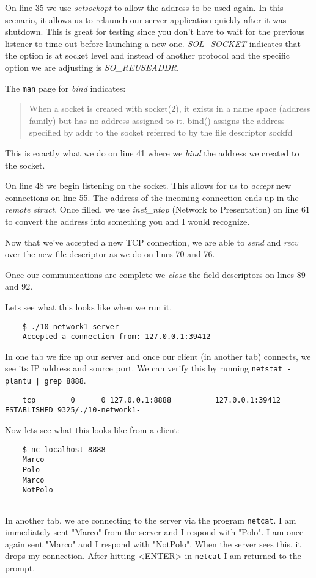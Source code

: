 \documentclass[../main.tex]{subfiles}
\begin{document}
	On line 35 we use \textit{setsockopt} to allow the address to be used again.  In this scenario, it allows us to relaunch our server application quickly after it was shutdown.  This is great for testing since you don't have to wait for the previous listener to time out before launching a new one.  \textit{SOL\_SOCKET} indicates that the option is at socket level and instead of another protocol and the specific option we are adjusting is \textit{SO\_REUSEADDR}.
	
	The \texttt{man} page for \textit{bind} indicates:
	\begin{quotation}
		When a socket is created with socket(2), it exists in a name space (address family) but has no address assigned to it.  bind() assigns the address specified by addr to the socket referred to by the file descriptor sockfd
	\end{quotation}
	This is exactly what we do on line 41 where we \textit{bind} the address we created to the socket.
	
	On line 48 we begin listening on the socket.  This allows for us to \textit{accept} new connections on line 55.  The address of the incoming connection ends up in the \textit{remote struct}.  Once filled, we use \textit{inet\_ntop} (Network to Presentation) on line 61 to convert the address into something you and I would recognize.
	
	Now that we've accepted a new TCP connection, we are able to \textit{send} and \textit{recv} over the new file descriptor as we do on lines 70 and 76.
	
	Once our communications are complete we \textit{close} the field descriptors on lines 89 and 92.
	
	Lets see what this looks like when we run it.
	
	\begin{verbatim}
	$ ./10-network1-server 
	Accepted a connection from: 127.0.0.1:39412
	\end{verbatim}
	
	In one tab we fire up our server and once our client (in another tab) connects, we see its IP address and source port.  We can verify this by running \texttt{netstat -plantu | grep 8888}.  
	
	\begin{verbatim}
	tcp        0      0 127.0.0.1:8888          127.0.0.1:39412         ESTABLISHED 9325/./10-network1- 
	\end{verbatim}
	
	Now lets see what this looks like from a client:
	
	\begin{verbatim}
	$ nc localhost 8888
	Marco
	Polo
	Marco
	NotPolo
	
	\end{verbatim}
	
	In another tab, we are connecting to the server via the program \texttt{netcat}.  I am immediately sent "Marco" from the server and I respond with "Polo".  I am once again sent "Marco" and I respond with "NotPolo".  When the server sees this, it drops my connection.  After hitting <ENTER> in \texttt{netcat} I am returned to the prompt.
	
\end{document}
